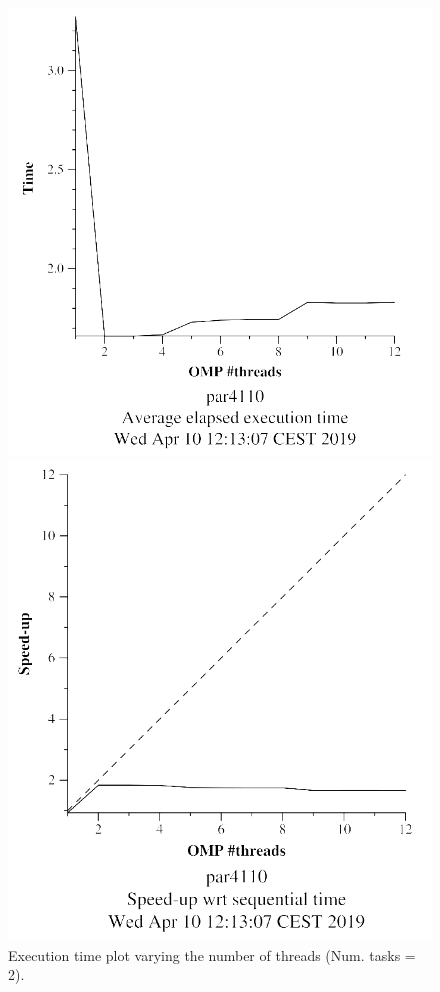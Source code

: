 \documentclass[12pt, a4paper]{article}
\begin{document}
\begin{figure}[H]
\centering
\begin{minipage}[b]{0.4\linewidth}
  \centering
  \includegraphics[scale=0.5]{./mandel-omp-10000-strong-omp-3-2-time}
  \caption{Execution time plot varying the number of threads (Num. tasks = 2).}
  \label{fig:mandel-omp-10000-strong-omp-3-2-time}
\end{minipage}%
\hspace{0.5cm}
\begin{minipage}[b]{0.4\linewidth}
  \centering
  \includegraphics[scale=0.5]{./mandel-omp-10000-strong-omp-3-2-speedup}

\end{minipage}
\end{figure}
\end{document}
